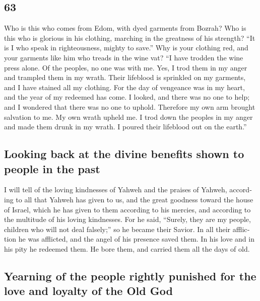 \begin{paracol}{2}
\begin{otherlanguage}{english}
\hypertarget{section-125}{%
\section{63}\label{section-125}}

 Who is this who comes from Edom, with dyed garments from
Bozrah? Who is this who is glorious in his clothing, marching in the
greatness of his strength? ``It is I who speak in righteousness, mighty
to save.''  Why is your clothing red, and your garments
like him who treads in the wine vat?  ``I have trodden the
wine press alone. Of the peoples, no one was with me. Yes, I trod them
in my anger and trampled them in my wrath. Their lifeblood is sprinkled
on my garments, and I have stained all my clothing.  For
the day of vengeance was in my heart, and the year of my redeemed has
come.  I looked, and there was no one to help; and I
wondered that there was no one to uphold. Therefore my own arm brought
salvation to me. My own wrath upheld me.  I trod down the
peoples in my anger and made them drunk in my wrath. I poured their
lifeblood out on the earth.''

\hypertarget{looking-back-at-the-divine-benefits-shown-to-people-in-the-past}{%
\subsection{Looking back at the divine benefits shown to people in the
past}\label{looking-back-at-the-divine-benefits-shown-to-people-in-the-past}}

 I will tell of the loving kindnesses of Yahweh and the
praises of Yahweh, according to all that Yahweh has given to us, and the
great goodness toward the house of Israel, which he has given to them
according to his mercies, and according to the multitude of his loving
kindnesses.  For he said, ``Surely, they are my people,
children who will not deal falsely;'' so he became their Savior.
 In all their affliction he was afflicted, and the angel
of his presence saved them. In his love and in his pity he redeemed
them. He bore them, and carried them all the days of old.

\hypertarget{yearning-of-the-people-rightly-punished-for-the-love-and-loyalty-of-the-old-god}{%
\subsection{Yearning of the people rightly punished for the love and
loyalty of the Old
God}\label{yearning-of-the-people-rightly-punished-for-the-love-and-loyalty-of-the-old-god}}


\end{otherlanguage}
\end{paracol}
